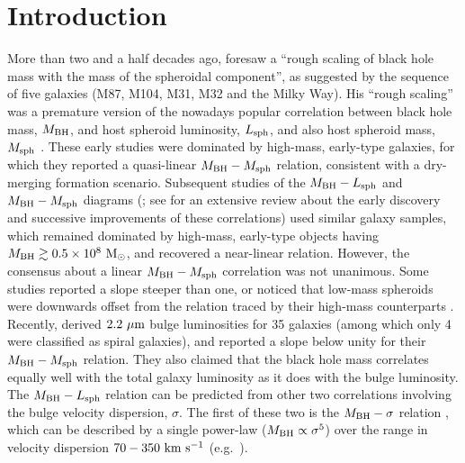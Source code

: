 \documentclass[preprint2]{emulateapj}
\begin{document}
\section{Introduction}
\label{sec:int}
More than two and a half decades ago, 
\cite{dressler1989} foresaw a ``rough scaling of black hole mass with the mass of the spheroidal component'', 
as suggested by the sequence of five galaxies (M87, M104, M31, M32 and the Milky Way). 
His ``rough scaling'' was a premature version of the nowadays popular correlation between black hole mass, $M_{\rm BH}$,  
and host spheroid luminosity, $L_{\rm sph}$, and also host spheroid mass, $M_{\rm sph}$ 
\citep{yee1992,kormendyrichstone1995,magorrian1998,marconihunt2003,haringrix2004}. 
These early studies were dominated by high-mass, early-type galaxies, 
for which they reported a quasi-linear $M_{\rm BH} - M_{\rm sph}$ relation, 
consistent with a dry-merging formation scenario. 
Subsequent studies of the $M_{\rm BH} - L_{\rm sph}$ and $M_{\rm BH} - M_{\rm sph}$ diagrams 
(\citealt{ferrareseford2005,lauer2007,graham2007,graham2008bar,gultelkin2009,sani2011,beifiori2012,erwingadotti2012,
vika2012,vandenbosch2012,mcconnellma2013,kormendyho2013,rusli2013}; 
see \citealt{graham2015bulges} for an extensive review about the early discovery and successive improvements of these correlations)
used similar galaxy samples, which remained dominated by high-mass, early-type objects having $M_{\rm BH} \gtrsim 0.5 \times 10^8~\rm M_\odot$, 
and recovered a near-linear relation. 
However, the consensus about a linear $M_{\rm BH} - M_{\rm sph}$ correlation was not unanimous. 
Some studies reported a slope steeper than one,  
or noticed that low-mass spheroids were downwards offset from the relation traced by their high-mass counterparts 
\citep{laor1998,wandel1999,laor2001,ryan2007}.
Recently, \cite{lasker2014data,lasker2014anal} derived $2.2~\rm \mu m$ bulge luminosities for 35 galaxies 
(among which only 4 were classified as spiral galaxies), 
and reported a slope below unity for their $M_{\rm BH} - M_{\rm sph}$ relation. 
They also claimed that the black hole mass correlates equally well with the total galaxy luminosity 
as it does with the bulge luminosity. \\
The $M_{\rm BH} - L_{\rm sph}$ relation can be predicted from other two correlations involving the bulge velocity dispersion, $\sigma$.
The first of these two is the $M_{\rm BH} - \sigma$ relation \citep{ferraresemerritt2000,gebhardt2000},
which can be described by a single power-law ($M_{\rm BH} \propto \sigma^5$) 
over the range in velocity dispersion $70-350~\rm km~s^{-1}$ (e.g.~\citealt{graham2011,mcconnell2011,grahamscott2013}).
\end{document}
